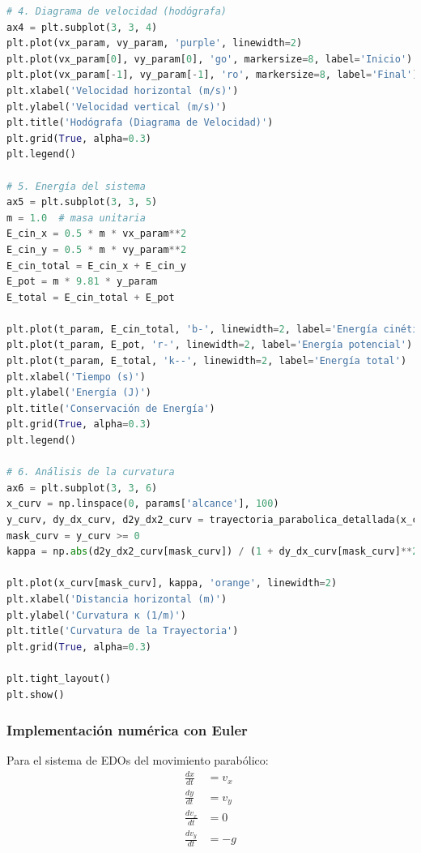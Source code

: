 \documentclass{article}
\begin{document}
\begin{lstlisting}[language=Python, caption={Análisis completo del movimiento parabólico}]
# 4. Diagrama de velocidad (hodógrafa)
ax4 = plt.subplot(3, 3, 4)
plt.plot(vx_param, vy_param, 'purple', linewidth=2)
plt.plot(vx_param[0], vy_param[0], 'go', markersize=8, label='Inicio')
plt.plot(vx_param[-1], vy_param[-1], 'ro', markersize=8, label='Final')
plt.xlabel('Velocidad horizontal (m/s)')
plt.ylabel('Velocidad vertical (m/s)')
plt.title('Hodógrafa (Diagrama de Velocidad)')
plt.grid(True, alpha=0.3)
plt.legend()

# 5. Energía del sistema
ax5 = plt.subplot(3, 3, 5)
m = 1.0  # masa unitaria
E_cin_x = 0.5 * m * vx_param**2
E_cin_y = 0.5 * m * vy_param**2
E_cin_total = E_cin_x + E_cin_y
E_pot = m * 9.81 * y_param
E_total = E_cin_total + E_pot

plt.plot(t_param, E_cin_total, 'b-', linewidth=2, label='Energía cinética')
plt.plot(t_param, E_pot, 'r-', linewidth=2, label='Energía potencial')
plt.plot(t_param, E_total, 'k--', linewidth=2, label='Energía total')
plt.xlabel('Tiempo (s)')
plt.ylabel('Energía (J)')
plt.title('Conservación de Energía')
plt.grid(True, alpha=0.3)
plt.legend()

# 6. Análisis de la curvatura
ax6 = plt.subplot(3, 3, 6)
x_curv = np.linspace(0, params['alcance'], 100)
y_curv, dy_dx_curv, d2y_dx2_curv = trayectoria_parabolica_detallada(x_curv)
mask_curv = y_curv >= 0
kappa = np.abs(d2y_dx2_curv[mask_curv]) / (1 + dy_dx_curv[mask_curv]**2)**(3/2)

plt.plot(x_curv[mask_curv], kappa, 'orange', linewidth=2)
plt.xlabel('Distancia horizontal (m)')
plt.ylabel('Curvatura κ (1/m)')
plt.title('Curvatura de la Trayectoria')
plt.grid(True, alpha=0.3)

plt.tight_layout()
plt.show()
	\end{lstlisting}

	\subsubsection{Implementación numérica con Euler}
	
	Para el sistema de EDOs del movimiento parabólico:
	\begin{align}
		\frac{dx}{dt} &= v_x \\
		\frac{dy}{dt} &= v_y \\
		\frac{dv_x}{dt} &= 0 \\
		\frac{dv_y}{dt} &= -g
	\end{align}
	
\end{document}
